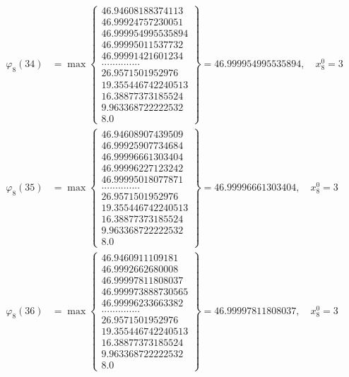 \documentclass{article}
\begin{document}
\begin{align*}
  
  
  
\varphi_{8}(34) &= \max \left\{ \begin{array}{c}
46.94608188374113 \\
 46.99924757230051 \\
 46.999954995535894 \\
 46.99995011537732 \\
 46.99991421601234 \\
 .............. \\
 26.9571501952976 \\
 19.355446742240513 \\
 16.38877373185524 \\
 9.963368722222532 \\
 8.0
\end{array} \right\} = 46.999954995535894, \quad x_{8}^0 = 3\\
  
  
  
  
\varphi_{8}(35) &= \max \left\{ \begin{array}{c}
46.94608907439509 \\
 46.99925907734684 \\
 46.99996661303404 \\
 46.99996227123242 \\
 46.99995018077871 \\
 .............. \\
 26.9571501952976 \\
 19.355446742240513 \\
 16.38877373185524 \\
 9.963368722222532 \\
 8.0
\end{array} \right\} = 46.99996661303404, \quad x_{8}^0 = 3\\
  
  
  
  
\varphi_{8}(36) &= \max \left\{ \begin{array}{c}
46.9460911109181 \\
 46.9992662680008 \\
 46.99997811808037 \\
 46.999973888730565 \\
 46.99996233663382 \\
 .............. \\
 26.9571501952976 \\
 19.355446742240513 \\
 16.38877373185524 \\
 9.963368722222532 \\
 8.0
\end{array} \right\} = 46.99997811808037, \quad x_{8}^0 = 3\\
  
  
\end{align*}
\end{document}

